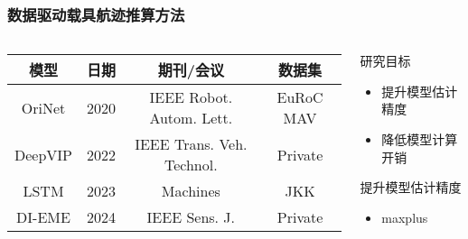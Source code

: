 \begin{frame}
	\frametitle{数据驱动载具航迹推算方法}
	\begin{columns}[t]
		\begin{column}{0.5\textwidth}
		{
		    \tiny
		    \setlength{\tabcolsep}{2pt}
			\begin{tabular*}{\linewidth}{@{\extracolsep{\fill}}cccc}
				\toprule
				\multicolumn{1}{c}{模型} & 日期 & 期刊/会议 & 数据集 \\
				\midrule
				OriNet  & 2020 & IEEE Robot. Autom. Lett.  & EuRoC MAV \\
				DeepVIP & 2022 & IEEE Trans. Veh. Technol. & Private   \\ %
				LSTM    & 2023 & Machines                  & JKK       \\
				DI-EME  & 2024 & IEEE Sens. J.             & Private   \\
				\bottomrule
			\end{tabular*}         
		}
		\end{column}   
		\begin{column}{0.5\textwidth}
		    \begin{block}{研究目标}
				\begin{itemize}
					\item 提升模型估计精度
					\item 降低模型计算开销
				\end{itemize}
			\end{block}
			\begin{block}{提升模型估计精度}
				\begin{itemize}
					\item maxplus
				\end{itemize}
			\end{block}
		\end{column}
	\end{columns}	
\end{frame}

